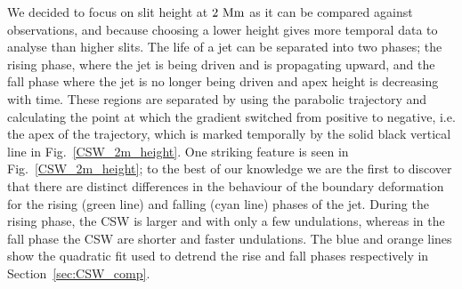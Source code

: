 %
We decided to focus on slit height at $2~\rm{Mm}$ as it can be compared against observations, and because choosing a lower height gives more temporal data to analyse than higher slits. The life of a jet can be separated into two phases; the rising phase, where the jet is being driven and is propagating upward, and the fall phase where the jet is no longer being driven and apex height is decreasing with time. These regions are separated by using the parabolic trajectory and calculating the point at which the gradient switched from positive to negative, i.e. the apex of the trajectory, which is marked temporally by the solid black vertical line in Fig.~\ref{CSW_2m_height}. One striking feature is seen in Fig.~\ref{CSW_2m_height}; to the best of our knowledge we are the first to discover that there are distinct differences in the behaviour of the boundary deformation for the rising (green line) and falling (cyan line) phases of the jet. During the rising phase, the CSW is larger and with only a few undulations,  whereas in the fall phase the CSW are shorter and faster undulations. The blue and orange lines show the quadratic fit used to detrend the rise and fall phases respectively in Section~\ref{sec:CSW_comp}. \np
%
